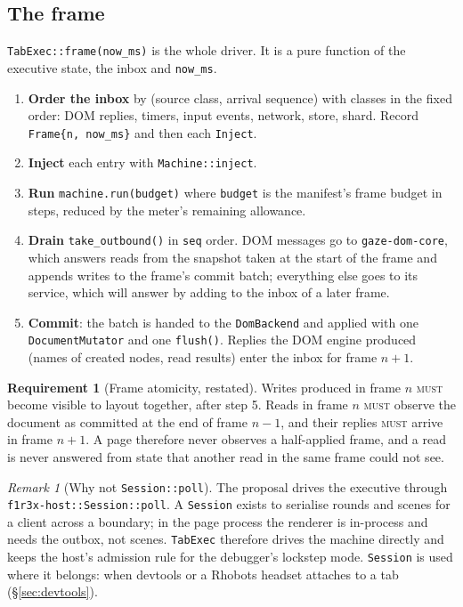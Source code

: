 \documentclass[11pt]{article}
\theoremstyle{definition}
\newtheorem{requirement}{Requirement}
\theoremstyle{remark}
\newtheorem{remark}{Remark}
\newcommand{\MUST}{\textsc{must}}
\newcommand{\code}[1]{\texttt{#1}}
\begin{document}
\subsection{The frame}
\code{TabExec::frame(now\_ms)} is the whole driver. It is a pure function of the
executive state, the inbox and \code{now\_ms}.

\begin{enumerate}[nosep]
\item \textbf{Order the inbox} by (source class, arrival sequence) with classes in
  the fixed order: DOM replies, timers, input events, network, store, shard. Record
  \code{Frame\{n, now\_ms\}} and then each \code{Inject}.
\item \textbf{Inject} each entry with \code{Machine::inject}.
\item \textbf{Run} \code{machine.run(budget)} where \code{budget} is the manifest's
  frame budget in steps, reduced by the meter's remaining allowance.
\item \textbf{Drain} \code{take\_outbound()} in \code{seq} order. DOM messages go to
  \code{gaze-dom-core}, which answers reads from the snapshot taken at the start of
  the frame and appends writes to the frame's commit batch; everything else goes to
  its service, which will answer by adding to the inbox of a later frame.
\item \textbf{Commit}: the batch is handed to the \code{DomBackend} and applied with
  one \code{DocumentMutator} and one \code{flush()}. Replies the DOM engine produced
  (names of created nodes, read results) enter the inbox for frame $n+1$.
\end{enumerate}

\begin{requirement}[Frame atomicity, restated]
Writes produced in frame $n$ \MUST{} become visible to layout together, after step
5. Reads in frame $n$ \MUST{} observe the document as committed at the end of frame
$n-1$, and their replies \MUST{} arrive in frame $n+1$. A page therefore never
observes a half-applied frame, and a read is never answered from state that another
read in the same frame could not see.
\end{requirement}

\begin{remark}[Why not \code{Session::poll}]
The proposal drives the executive through \code{f1r3x-host::Session::poll}. A
\code{Session} exists to serialise rounds and scenes for a client across a boundary;
in the page process the renderer is in-process and needs the outbox, not scenes.
\code{TabExec} therefore drives the machine directly and keeps the host's admission
rule for the debugger's lockstep mode. \code{Session} is used where it belongs: when
devtools or a Rhobots headset attaches to a tab (\S\ref{sec:devtools}).
\end{remark}
\end{document}
